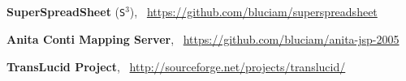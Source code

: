 \subsection*{\titleLogiciels}
\vspace*{-0.2cm}

{{\bf SuperSpreadSheet} (\texttt{S$^3$})},~
\href{https://github.com/bluciam/superspreadsheet}{
{\footnotesize{\url{ https://github.com/bluciam/superspreadsheet}}}
}

\hspace*{1cm}
\parbox{14cm}{
\superspreadsheet
}

{\bf Anita Conti Mapping Server},~
\href{https://github.com/bluciam/anita-jsp-2005}{
{\footnotesize{\url{ https://github.com/bluciam/anita-jsp-2005}}}
}

\hspace*{1cm}
\parbox{14cm}{
\acms
}

\newpage

\vspace*{0.5cm}

{{\bf TransLucid Project}},~
\href{http://sourceforge.net/projects/translucid}{
{\footnotesize{\url{ http://sourceforge.net/projects/translucid/}}}
}

\hspace*{1cm}
\parbox{14cm}{
\translucid
}
